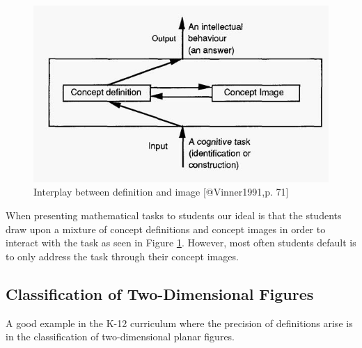 \documentclass[
]{book}
\theoremstyle{definition}
\theoremstyle{definition}
\theoremstyle{definition}
\theoremstyle{definition}
\theoremstyle{remark}
\begin{document}
\begin{figure}

{\centering \includegraphics[width=8.17in]{images/concept-image} 

}

\caption{Interplay between definition and image [@Vinner1991,p. 71]}\label{fig:concept-image}
\end{figure}

When presenting mathematical tasks to students our ideal is that the students draw upon a mixture of concept definitions and concept images in order to interact with the task as seen in Figure \ref{fig:concept-image}. However, most often students default is to only address the task through their concept images.

\hypertarget{classification-of-two-dimensional-figures}{%
\subsection{Classification of Two-Dimensional Figures}\label{classification-of-two-dimensional-figures}}

A good example in the K-12 curriculum where the precision of definitions arise is in the classification of two-dimensional planar figures.
\end{document}
